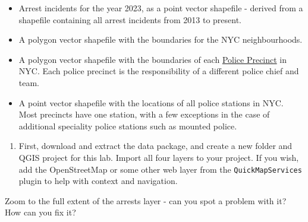 \documentclass[
  letterpaper,
  DIV=11,
  numbers=noendperiod]{scrreprt}
\providecommand{\tightlist}{%
  \setlength{\itemsep}{0pt}\setlength{\parskip}{0pt}}\usepackage{longtable,booktabs,array}
\begin{document}
\begin{itemize}
\item
  Arrest incidents for the year 2023, as a point vector shapefile -
  derived from a shapefile containing all arrest incidents from 2013 to
  present.
\item
  A polygon vector shapefile with the boundaries for the NYC
  neighbourhoods.
\item
  A polygon vector shapefile with the boundaries of each
  \href{https://www.nyc.gov/site/nypd/bureaus/patrol/find-your-precinct.page}{Police
  Precinct} in NYC. Each police precinct is the responsibility of a
  different police chief and team.
\item
  A point vector shapefile with the locations of all police stations in
  NYC. Most precincts have one station, with a few exceptions in the
  case of additional speciality police stations such as mounted police.
\end{itemize}

\begin{enumerate}
\def\labelenumi{(\arabic{enumi})}
\setcounter{enumi}{335}
\tightlist
\item
  First, download and extract the data package, and create a new folder
  and QGIS project for this lab. Import all four layers to your project.
  If you wish, add the OpenStreetMap or some other web layer from the
  \texttt{QuickMapServices} plugin to help with context and navigation.
\end{enumerate}

\begin{tcolorbox}[enhanced jigsaw, breakable, toptitle=1mm, colback=white, left=2mm, leftrule=.75mm, titlerule=0mm, colframe=quarto-callout-important-color-frame, opacityback=0, title=\textcolor{quarto-callout-important-color}{\faExclamation}\hspace{0.5em}{Stop and Think}, toprule=.15mm, opacitybacktitle=0.6, bottomtitle=1mm, colbacktitle=quarto-callout-important-color!10!white, bottomrule=.15mm, coltitle=black, rightrule=.15mm, arc=.35mm]

Zoom to the full extent of the arrests layer - can you spot a problem
with it? How can you fix it?

\end{tcolorbox}
\end{document}
